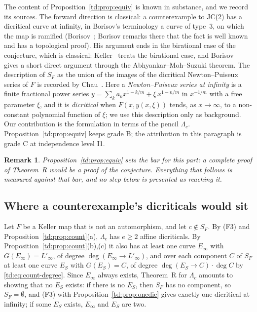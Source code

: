 \documentclass[a4paper,11pt]{article}
\theoremstyle{jsplain}
\theoremstyle{jsdef}
\theoremstyle{jsrem}
\newtheorem{remark}[theorem]{Remark}
\begin{document}
The content of Proposition~\ref{td:prop:equiv} is known in substance, and we record its
sources. The forward direction is classical: a counterexample to JC(2) has a dicritical curve at
infinity, in Borisov's terminology a curve of type~$3$, on which the map is ramified
(Borisov~\cite[Thm.~3.1]{Borisov2011}; Borisov remarks there that the fact is well known and has
a topological proof). His argument ends in the birational case of the conjecture, which is
classical: Keller~\cite{Keller1939} treats the birational case, and
Borisov~\cite[proof of Thm.~14]{Borisov2009} gives a short direct argument through the
Abhyankar--Moh--Suzuki theorem. The description of $S_F$ as the union of the images of the
dicritical Newton--Puiseux series of $F$ is recorded by Chau~\cite[\S1, item (iii)]{Chau2007}.
Here a \emph{Newton--Puiseux series at infinity} is a finite fractional power series
$y = \sum_k a_k x^{1 - k/m} + \xi\, x^{1 - n/m}$ in $x^{-1/m}$ with a free parameter $\xi$, and it
is \emph{dicritical} when $F(x, y(x,\xi))$ tends, as $x \to \infty$, to a non-constant polynomial
function of $\xi$; we use this description only as background. Our contribution is the
formulation in terms of the pencil $\Lambda_c$. Proposition~\ref{td:prop:equiv} keeps grade B;
the attribution in this paragraph is grade C at independence level I1.

\begin{remark}
Proposition~\ref{td:prop:equiv} sets the bar for this part: a complete proof of Theorem~R would
be a proof of the conjecture. Everything that follows is measured against that bar, and no step
below is presented as reaching it.
\end{remark}

\subsection{Where a counterexample's dicriticals would sit}\label{td:sec:where}

Let $F$ be a Keller map that is not an automorphism, and let $c \notin S_F$. By (F3) and
Proposition~\ref{td:prop:count}(a), $\Lambda_c$ has $e \geq 2$ affine dicriticals. By
Proposition~\ref{td:prop:count}(b),(c) it also has at least one curve $E_\infty$ with
$G(E_\infty) = L'_\infty$, of degree $\deg(E_\infty \to L'_\infty)$, and over each component $C$
of $S_F$ at least one curve $E_S$ with $G(E_S) = C$, of degree $\deg(E_S \to C) \cdot \deg C$ by
\eqref{td:eq:count-degree}. Since $E_\infty$ always exists, Theorem~R for $\Lambda_c$ amounts to
showing that no $E_S$ exists: if there is no $E_S$, then $S_F$ has no component, so
$S_F = \emptyset$, and (F3) with Proposition~\ref{td:prop:onedic} gives exactly one dicritical
at infinity; if some $E_S$ exists, $E_\infty$ and $E_S$ are two.
\end{document}
